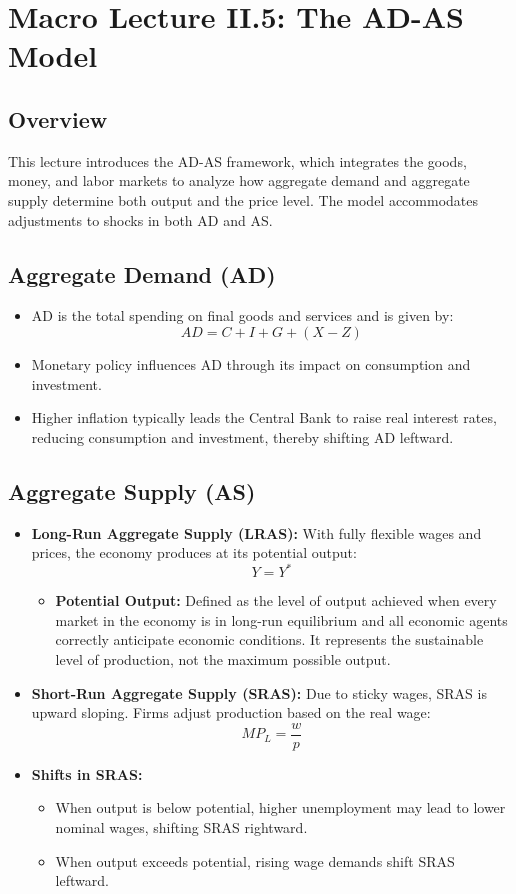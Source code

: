 \chapter*{Macro Lecture II.5: The AD-AS Model}
\section*{Overview}
This lecture introduces the AD-AS framework, which integrates the goods, money, and labor markets to analyze how aggregate demand and aggregate supply determine both output and the price level. The model accommodates adjustments to shocks in both AD and AS.

\section*{Aggregate Demand (AD)}
\begin{itemize}
    \item AD is the total spending on final goods and services and is given by:
    \[
    AD = C + I + G + (X - Z)
    \]
    \item Monetary policy influences AD through its impact on consumption and investment.
    \item Higher inflation typically leads the Central Bank to raise real interest rates, reducing consumption and investment, thereby shifting AD leftward.
\end{itemize}

\section*{Aggregate Supply (AS)}
\begin{itemize}
    \item \textbf{Long-Run Aggregate Supply (LRAS):} With fully flexible wages and prices, the economy produces at its potential output:
    \[
    Y = Y^*
    \]
    \begin{itemize}
        \item \textbf{Potential Output:} Defined as the level of output achieved when every market in the economy is in long-run equilibrium and all economic agents correctly anticipate economic conditions. It represents the sustainable level of production, not the maximum possible output.
    \end{itemize}
    \item \textbf{Short-Run Aggregate Supply (SRAS):} Due to sticky wages, SRAS is upward sloping. Firms adjust production based on the real wage:
    \[
    MP_L = \frac{w}{p}
    \]
    \item \textbf{Shifts in SRAS:}
    \begin{itemize}
        \item When output is below potential, higher unemployment may lead to lower nominal wages, shifting SRAS rightward.
        \item When output exceeds potential, rising wage demands shift SRAS leftward.
    \end{itemize}
\end{itemize}


